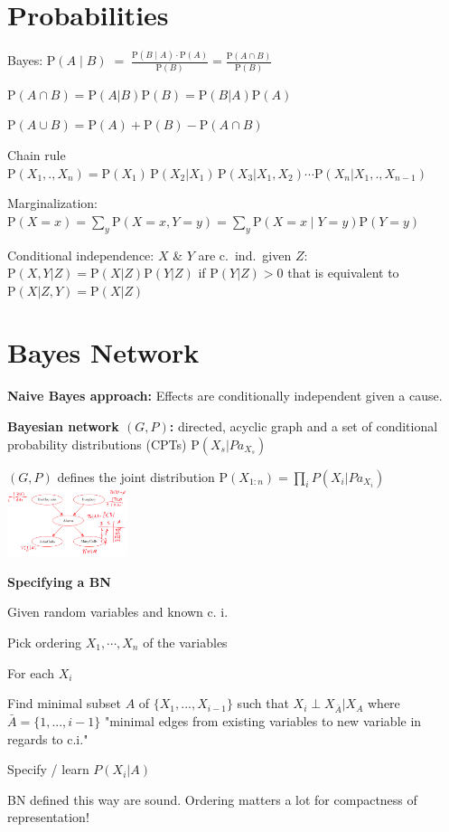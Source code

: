 \documentclass[a4paper, 11pt, landscape]{article}
\newcommand{\uP}{\mathrm P}
\begin{document}
	\begin{multicols*}{3}
		
		\section{Probabilities}
		\begin{compactitem}[]
			\item[] Bayes: $\uP(A\mid B) \; = \; \frac {\uP(B\mid A) \cdot \uP(A)} {\uP(B)} = \frac{\uP(A\cap B)}{\uP(B)}$
			\item[] $\uP(A\cap B) = \uP(A|B)\uP(B) = \uP(B|A)\uP(A)$
			\item[] $\uP(A\cup B)=\uP(A)+\uP(B)-{{\uP(A\cap B)}}$
			\item[] Chain rule $\uP (X_{1},.,X_{n})=\uP(X_{1})\,\uP(X_{2}| X_{1})\,\uP(X_{3}| X_{1},X_{2}) \cdots \uP(X_{n} | X_{1},.,X_{n-1})$
			\item[] Marginalization: $ \uP(X=x)=\sum _{y}\uP(X=x,Y=y)=\sum _{y}\uP(X=x\mid Y=y)\uP(Y=y)$
			\item[] Conditional independence: $X$ \& $Y$ are c.\ ind.\ given $Z$: $\uP(X, Y| Z) = \uP(X|Z) \uP(Y|Z)$ if $\uP(Y|Z) > 0$ that is equivalent to $\uP(X|Z,Y) = \uP(X | Z)$
		\end{compactitem}
	
	
		\section{Bayes Network}
		\textbf{Naive Bayes approach:} Effects are conditionally independent given a cause.
		
		\textbf{Bayesian network $(G,P)$:} directed, acyclic graph and a set of conditional probability distributions (CPTs) $\uP(X_s| Pa_{X_{s}})$
		
		 $(G,P)$ defines the joint distribution $\mathrm {P} (X_{1:n}) = \prod_{i} P(X_i| Pa_{X_{i}})$  
		\includegraphics[height=2cm]{img/pai1.png}
		 
		\textbf{Specifying a BN}
		\begin{compactitem}
			\item Given random variables and known c. i.
			\item Pick ordering $X_1, \cdots, X_n$ of the variables
			\item For each $X_i$
			\begin{compactenum}
				\item Find minimal subset $A$ of $\{X_1,...,X_{i-1}\}$ such that $X_i \perp X_{\bar{A}} | X_A$ where $\bar{A} = \{1,...,i-1\}$ "minimal edges from existing variables to new variable in regards to c.i."
				\item Specify / learn $P(X_i|A)$
			\end{compactenum}
		\end{compactitem}
		BN defined this way are sound. Ordering matters a lot for compactness of representation!
		

\end{multicols*}
\end{document}
